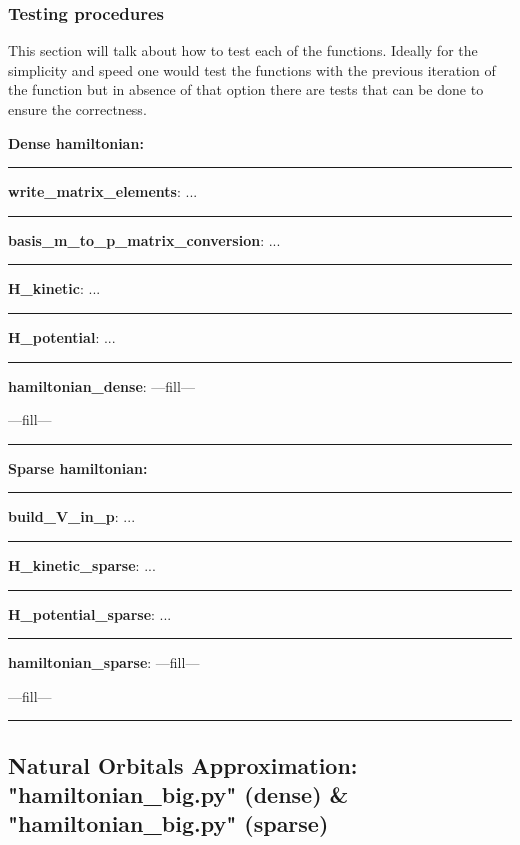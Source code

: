 \documentclass[a4paper,10pt]{article}
\begin{document}
\subsubsection{Testing procedures}

This section will talk about how to test each of the functions. Ideally for the simplicity and speed one would test the functions with the previous iteration of the function but in absence of that option there are tests that can be done to ensure the correctness.


\textbf{\newline Dense hamiltonian:}

\noindent\rule{\linewidth}{0.4pt}

\textbf{write\_matrix\_elements}: ...

\noindent\rule{\linewidth}{0.4pt}

\textbf{basis\_m\_to\_p\_matrix\_conversion}: ...

\noindent\rule{\linewidth}{0.4pt}

\textbf{H\_kinetic}: ...

\noindent\rule{\linewidth}{0.4pt}

\textbf{H\_potential}: ...

\noindent\rule{\linewidth}{0.4pt}

\textbf{hamiltonian\_dense}: ---fill---

---fill---

\noindent\rule{\linewidth}{0.4pt}


\textbf{\newline Sparse hamiltonian:}

\noindent\rule{\linewidth}{0.4pt}

\textbf{build\_V\_in\_p}: ...

\noindent\rule{\linewidth}{0.4pt}

\textbf{H\_kinetic\_sparse}: ...

\noindent\rule{\linewidth}{0.4pt}

\textbf{H\_potential\_sparse}: ...

\noindent\rule{\linewidth}{0.4pt}

\textbf{hamiltonian\_sparse}: ---fill---

---fill---

\noindent\rule{\linewidth}{0.4pt}




\subsection{Natural Orbitals Approximation: "hamiltonian\_big.py" (dense) \& "hamiltonian\_big.py" (sparse) }
\end{document}
